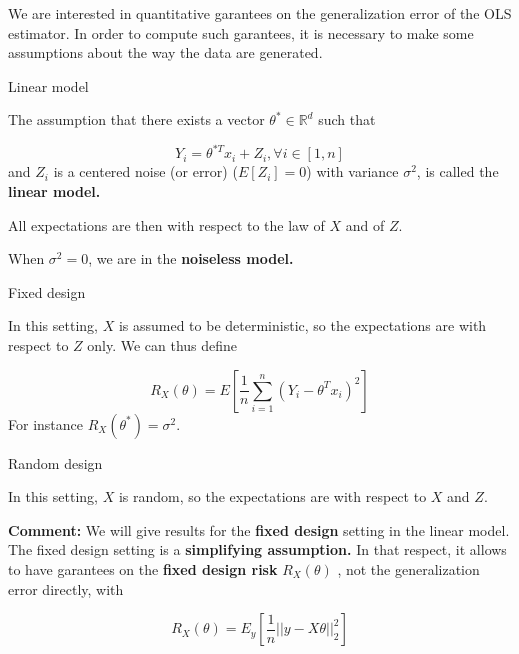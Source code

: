 \documentclass[
10pt, %
a4paper, %
oneside, %
headinclude,footinclude, %
BCOR5mm, %
]{scrartcl}
\begin{document}
We are interested in quantitative garantees on the generalization error of the OLS estimator. In order to compute such garantees, it is necessary to make some assumptions about the way the data are generated.

\begin{definition}{Linear model}

    The assumption that there exists a vector $ \theta^*\in \mathbb{R}^d$ such that 

    \begin{equation*}
	Y_i = \theta^{*T}x_i+Z_i, \forall i\in [1, n]
    \end{equation*}
    and $Z_i$ is a centered noise (or error)  ($E[Z_i]=0$) with variance $ \sigma^2$, is called the \textbf{{linear model.}} 
\end{definition}

All expectations are then with respect to the law of $X$ and of $Z$.

\begin{remark}

    When $\sigma^2=0$, we are in the \textbf{{noiseless model.}} 
    
\end{remark}

\begin{definition}{Fixed design}

    In this setting, $X$ is assumed to be deterministic, so the expectations are with respect to $Z$ only.  We can thus define

    \begin{equation*}
	R_X(\theta)    = E[ \frac{1}{n} \sum^{n}_{i=1} (Y_i-\theta^Tx_i)^2]
    \end{equation*}
    For instance $ R_X(\theta^*) = \sigma^2$.
\end{definition}

\begin{definition}{Random design}

    In this setting, $X$ is random, so the expectations are with respect to $X$ and $Z$.
\end{definition}

\textbf{{Comment:}} We will give results for the \textbf{{fixed design}} setting in the linear model. The fixed design setting is a \textbf{{simplifying assumption.}}  In that respect, it allows to have garantees on the \textbf{{fixed design risk}} $R_X(\theta)$ , not the generalization error directly, with

\begin{equation}
    R_X(\theta) = E_y[ \frac{1}{n} ||y-X\theta||_2^2]
\end{equation}
\end{document}
